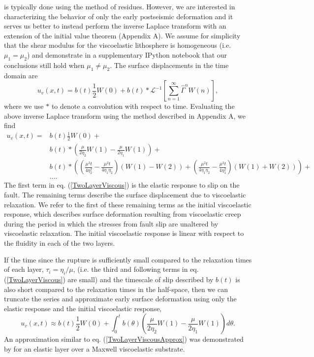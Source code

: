 is typically done using the method of residues. However, we are
interested in characterizing the behavior of only the early
postseismic deformation and it serves us better to instead perform the
inverse Laplace transform with an extension of the initial value
theorem (Appendix A). We assume for simplicity that the shear modulus
for the viscoelastic lithosphere is homogeneous (i.e. $\mu_1 = \mu_2$)
and demonstrate in a supplementary IPython notebook that our
conclusions still hold when $\mu_1 \neq \mu_2$.  The surface
displacements in the time domain are
\begin{equation}
 u_v(x,t) = b(t)\frac{1}{2}W(0) + 
            b(t)\ast\mathcal{L}^{-1}\left[\sum_{n=1}^\infty\hat{\Gamma}^{n}W(n)\right],
\end{equation}
where we use $*$ to denote a convolution with respect to time.
Evaluating the above inverse Laplace transform using the method
described in Appendix A, we find
\begin{align}\label{TwoLayerViscous}
  u_v(x,t) = &b(t)\frac{1}{2}W(0) +\nonumber\\
             &b(t)\ast\left(\frac{\mu}{2\eta_2}W(1) - \frac{\mu}{2\eta_1}W(1)\right) +\nonumber\\
             &b(t)\ast\left(\left(\frac{\mu^2t}{4\eta_2^2} -
                  \frac{\mu^2t}{4\eta_1\eta_2}\right) \left(W(1) - W(2)\right) +
                  \left(\frac{\mu^2t}{4\eta_1\eta_2} - \frac{\mu^2t}{4\eta_1^2}\right)
                  \left(W(1) + W(2)\right)\right) + \nonumber\\ 
             &\dots.
\end{align}
The first term in eq. (\ref{TwoLayerViscous}) is the elastic response
to slip on the fault.  The remaining terms describe the surface
displacement due to viscoelastic relaxation.  We refer to the first of
these remaining terms as the initial viscoelastic response, which
describes surface deformation resulting from viscoelastic creep during
the period in which the stresses from fault slip are unaltered by
viscoelastic relaxation.  The initial viscoelastic response is linear
with respect to the fluidity in each of the two layers.

If the time since the rupture is sufficiently small compared to the
relaxation times of each layer, $\tau_i=\eta_i/\mu$, (i.e. the third
and following terms in eq. (\ref{TwoLayerViscous}) are small) and the
timescale of slip described by $b(t)$ is also short compared to the
relaxation times in the half-space, then we can truncate the series and
approximate early surface deformation using only the elastic response
and the initial viscoelastic response,
\begin{equation}\label{TwoLayerViscousApprox}
 u_v(x,t) \approx b(t)\frac{1}{2}W(0) + 
          \int_0^t b(\theta)\left(\frac{\mu}{2\eta_2}W(1) - 
                  \frac{\mu}{2\eta_1}W(1)\right)d\theta.
\end{equation} 
An approximation similar to eq. (\ref{TwoLayerViscousApprox}) was
demonstrated by \citet{Segall2010} for an elastic layer over a Maxwell
viscoelastic substrate. 

